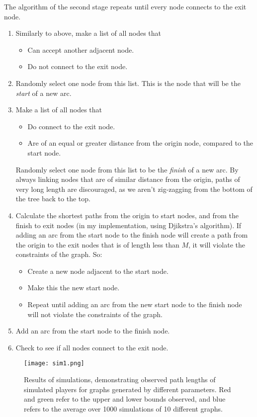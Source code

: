 \documentclass[landscape, a0, final]{a0poster}
\begin{document}
\begin{minipage}[c]{0.49\linewidth}
\begin{minipage}[c]{0.45\linewidth}
The algorithm of the second stage repeats until every node connects to the exit node. 
\begin{enumerate} 
    \item Similarly to above, make a list of all nodes that 
        \begin{itemize} 
            \item Can accept another adjacent node.
            \item Do not connect to the exit node.
        \end{itemize} 
    \item Randomly select one node from this list.  This is the node that will be the \emph{start} of a new arc.
    \item Make a list of all nodes that 
        \begin{itemize} 
            \item Do connect to the exit node.
            \item Are of an equal or greater distance from the origin node, compared to the start node.
        \end{itemize} 
    Randomly select one node from this list to be the \emph{finish} of a new arc.  By always linking nodes that are of similar distance from the origin, paths of very long length are discouraged, as we aren't zig-zagging from the bottom of the tree back to the top.
    \item Calculate the shortest paths from the origin to start nodes, and from the finish to exit nodes (in my implementation, using Djikstra's algorithm).  If adding an arc from the start node to the finish node will create a path from the origin to the exit nodes that is of length less than $M$, it will violate the constraints of the graph.  So: 
        \begin{itemize} 
            \item Create a new node adjacent to the start node.
            \item Make this the new start node.
            \item Repeat until adding an arc from the new start node to the finish node will not violate the constraints of the graph.
        \end{itemize}
    \item Add an arc from the start node to the finish node.
    \item Check to see if all nodes connect to the exit node.
\end{enumerate} 

\centering 
        \begin{figure}[H]
            \texttt{[image: sim1.png]} 
            \caption{Results of simulations, demonstrating observed path lengths of simulated players for graphs generated by different parameters.  Red and green refer to the upper and lower bounds observed, and blue refers to the average over 1000 simulations of 10 different graphs.} 
            \label{sim1}
        \end{figure}



\end{minipage} 
\end{minipage} 
\end{document}
